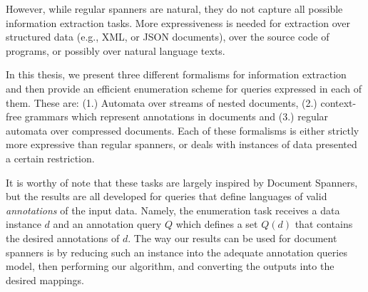 However, while regular spanners are natural, they do not capture all
possible information extraction tasks. More
expressiveness is needed for extraction over structured data (e.g., XML,
or JSON documents), over the source code of programs, or possibly over
natural language texts. 

In this thesis, we present three different formalisms for information extraction and then provide an efficient enumeration scheme for queries expressed in each of them. 
These are: (1.) Automata over streams of nested documents, (2.) context-free grammars which represent annotations in documents and (3.) regular automata over compressed documents. 
Each of these formalisms is either strictly more expressive than regular spanners, or deals with instances of data presented a certain restriction.

It is worthy of note that these tasks are largely inspired by Document Spanners, but the results are all developed for queries that define languages of valid {\it annotations} of the input data. Namely, the enumeration task receives a data instance $d$ and an annotation query $Q$ which defines a set $Q(d)$ that contains the desired annotations of $d$. The way our results can be used for document spanners is by reducing such an instance into the adequate annotation queries model, then performing our algorithm, and converting the outputs into the desired mappings.


